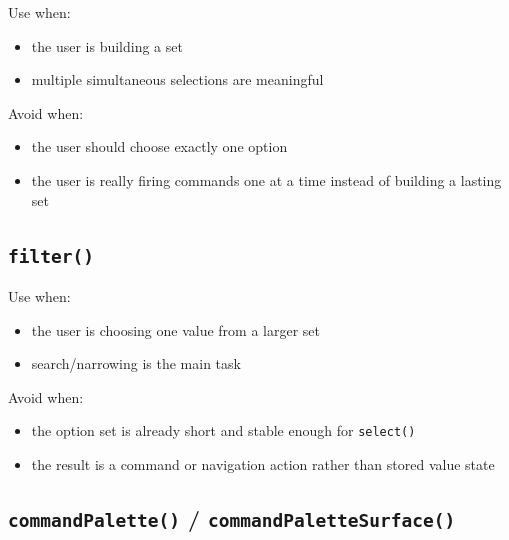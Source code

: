 Use when:

\begin{itemize}
\tightlist
\item
  the user is building a set
\item
  multiple simultaneous selections are meaningful
\end{itemize}

Avoid when:

\begin{itemize}
\tightlist
\item
  the user should choose exactly one option
\item
  the user is really firing commands one at a time instead of building a lasting set
\end{itemize}

\subsection{\texorpdfstring{\texttt{f\allowbreak{}i\allowbreak{}l\allowbreak{}t\allowbreak{}e\allowbreak{}r\allowbreak{}(\allowbreak{})}}{}}\label{record-023-filter}

Use when:

\begin{itemize}
\tightlist
\item
  the user is choosing one value from a larger set
\item
  search/narrowing is the main task
\end{itemize}

Avoid when:

\begin{itemize}
\tightlist
\item
  the option set is already short and stable enough for \texttt{s\allowbreak{}e\allowbreak{}l\allowbreak{}e\allowbreak{}c\allowbreak{}t\allowbreak{}(\allowbreak{})}
\item
  the result is a command or navigation action rather than stored value state
\end{itemize}

\subsection{\texorpdfstring{\texttt{c\allowbreak{}o\allowbreak{}m\allowbreak{}m\allowbreak{}a\allowbreak{}n\allowbreak{}d\allowbreak{}P\allowbreak{}a\allowbreak{}l\allowbreak{}e\allowbreak{}t\allowbreak{}t\allowbreak{}e\allowbreak{}(\allowbreak{})} / \texttt{c\allowbreak{}o\allowbreak{}m\allowbreak{}m\allowbreak{}a\allowbreak{}n\allowbreak{}d\allowbreak{}P\allowbreak{}a\allowbreak{}l\allowbreak{}e\allowbreak{}t\allowbreak{}t\allowbreak{}e\allowbreak{}S\allowbreak{}u\allowbreak{}r\allowbreak{}f\allowbreak{}a\allowbreak{}c\allowbreak{}e\allowbreak{}(\allowbreak{})}}{ / }}\label{record-023-commandpalette-commandpalettesurface}

